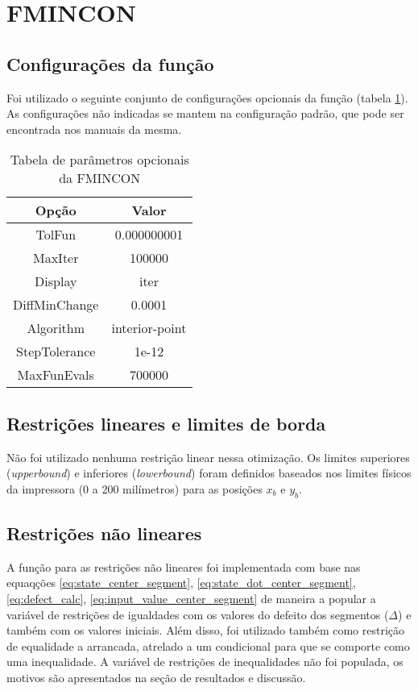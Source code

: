 \section{FMINCON}

\subsection{Configurações da função}
Foi utilizado o seguinte conjunto de configurações opcionais da função (tabela \ref{tab:fmincon_options}).
As configurações não indicadas se mantem na configuração padrão, que pode ser encontrada nos manuais da mesma.

\begin{table}
    \begin{center}
    \caption{Tabela de parâmetros opcionais da FMINCON}
    \label{tab:fmincon_options}
    \begin{tabular}{c c}
        Opção & Valor \\ \hline
        TolFun & 0.000000001 \\
        MaxIter & 100000 \\
        Display & iter \\
        DiffMinChange & 0.0001 \\
        Algorithm & interior-point \\
        StepTolerance & 1e-12 \\
        MaxFunEvals & 700000  \\ \hline
    \end{tabular}
    \end{center}
\end{table}

\subsection{Restrições lineares e limites de borda}
Não foi utilizado nenhuma restrição linear nessa otimização.
Os limites superiores (\textit{upperbound}) e inferiores (\textit{lowerbound}) foram definidos
baseados nos limites físicos da impressora (0 a 200 milímetros) para as posições $x_b$ e $y_b$.

\subsection{Restrições não lineares}
A função para as restrições não lineares foi implementada com base nas equaqções \ref{eq:state_center_segment},
\ref{eq:state_dot_center_segment}, \ref{eq:defect_calc}, \ref{eq:input_value_center_segment} de maneira a
popular a variável de restrições de igualdades com os valores do defeito dos segmentos ($\Delta$) e também
com os valores iniciais. 
Além disso, foi utilizado também como restrição de equalidade a arrancada, atrelado a um condicional para que
se comporte como uma inequalidade.
A variável de restrições de inequalidades não foi populada, os motivos são apresentados
na seção de resultados e discussão.

